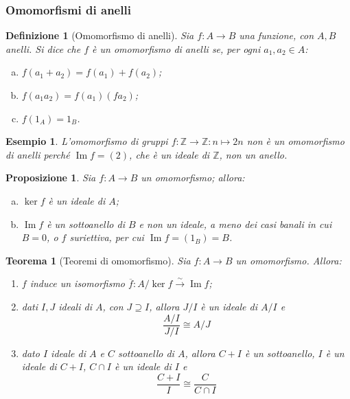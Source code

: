 \documentclass[12pt]{scrartcl}
\theoremstyle{style}
\newtheorem{esempio}{Esempio}[section]
\newtheorem{definizione}{Definizione}[section]
\newtheorem{prop}{Proposizione}[section]
\newtheorem{teorema}{Teorema}[section]
\theoremstyle{style1}
\numberwithin{equation}{subsection}
\begin{document}
\subsubsection{Omomorfismi di anelli}
\begin{definizione}
	[Omomorfismo di anelli]
	Sia $f:A\to B$ una funzione, con $A,B$ anelli. Si dice che $f$ \`e un omomorfismo di anelli se, per ogni $a_1,a_2\in A$:
	\begin{enumerate}[(a).]
		\item $f(a_1+a_2) = f(a_1) + f(a_2)$;
		\item $f(a_1a_2) = f(a_1)(fa_2)$;
		\item $f(1_A) = 1_B$.
	\end{enumerate}
\end{definizione}

\begin{esempio}
L'omomorfismo di gruppi $f:\mathbb{Z}\to \mathbb{Z}:n \longmapsto 2n$ non \`e un omomorfismo di anelli perch\'e $\operatorname{Im} f = (2)$, che \`e un ideale di $\mathbb{Z}$, non un anello.
\end{esempio}
\begin{prop}
Sia $f : A \to B$ un omomorfismo; allora:
\begin{enumerate}[(a).]
	\item $\operatorname{ker} f$ \`e un ideale di $A$;
	\item $\operatorname{Im} f$ \`e un sottoanello di $B$ e non un ideale, a meno dei casi banali in cui $B=0$, o $f$ suriettiva, per cui $\operatorname{Im} f = (1_B) = B$.
\end{enumerate}
\end{prop}
\begin{teorema}
	[Teoremi di omomorfismo]
	Sia $f:A\to B$ un omomorfismo.
	Allora:
	\begin{enumerate}[(1).]
		\item $f$ induce un isomorfismo $\overline{f}:A  /\operatorname{ker} f \xrightarrow{\ \sim\ } \operatorname{Im} f$;
		\item dati $I,J$ ideali di $A$, con $J \supseteq I$, allora $J / I$ \`e un ideale di $A / I$ e 
			\[
				\frac{A / I }{J / I}\cong A / J
			\] 
		\item dato $I$ ideale di $A$ e $C$ sottoanello di $A$, allora $C+I$ \`e un sottoanello, $I$ \`e un ideale di $C+I$, $C\cap I$ \`e un ideale di $I$ e
			\[
			\frac{C+I}{I}\cong \frac{C}{C\cap I}
			\] 
	\end{enumerate}
\end{teorema}
\end{document}
